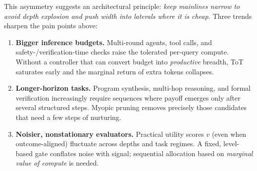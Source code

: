 \documentclass{article}
\begin{document}
This asymmetry suggests an architectural principle:
\emph{keep mainlines narrow to avoid depth explosion and push width into laterals where it is cheap.}
Three trends sharpen the pain points above:
\begin{enumerate}[leftmargin=*, itemsep=2pt, topsep=2pt]
    \item \textbf{Bigger inference budgets.} Multi-round agents, tool calls, and safety-/verification-time checks raise the tolerated per-query compute. Without a controller that can convert budget into \emph{productive} breadth, ToT saturates early and the marginal return of extra tokens collapses.
    \item \textbf{Longer-horizon tasks.} Program synthesis, multi-hop reasoning, and formal verification increasingly require sequences where payoff emerges only after several structured steps. Myopic pruning removes precisely those candidates that need a few steps of nurturing.
    \item \textbf{Noisier, nonstationary evaluators.} Practical utility scores $v$ (even when outcome-aligned) fluctuate across depths and task regimes. A fixed, level-based gate conflates noise with signal; sequential allocation based on \emph{marginal value of compute} is needed.
\end{enumerate}
\end{document}
